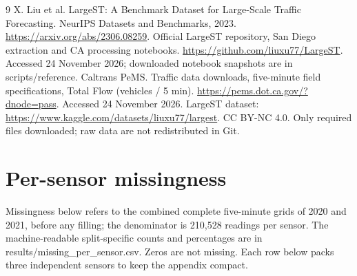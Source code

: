 \documentclass[11pt,a4paper]{article}
\begin{document}
\begin{thebibliography}{9}
 X. Liu et al. LargeST: A Benchmark Dataset for Large-Scale Traffic Forecasting. NeurIPS Datasets and Benchmarks, 2023. \url{https://arxiv.org/abs/2306.08259}.
 Official LargeST repository, San Diego extraction and CA processing notebooks. \url{https://github.com/liuxu77/LargeST}. Accessed 24 November 2026; downloaded notebook snapshots are in scripts/reference.
 Caltrans PeMS. Traffic data downloads, five-minute field specifications, Total Flow (vehicles / 5 min). \url{https://pems.dot.ca.gov/?dnode=pass}. Accessed 24 November 2026.
 LargeST dataset: \url{https://www.kaggle.com/datasets/liuxu77/largest}. CC BY-NC 4.0. Only required files downloaded; raw data are not redistributed in Git.
\end{thebibliography}
\clearpage\appendix\section{Per-sensor missingness}
Missingness below refers to the combined complete five-minute grids of 2020 and 2021, before any filling; the denominator is 210,528 readings per sensor. The machine-readable split-specific counts and percentages are in results/missing\_per\_sensor.csv. Zeros are not missing. Each row below packs three independent sensors to keep the appendix compact.
\small
\end{document}

